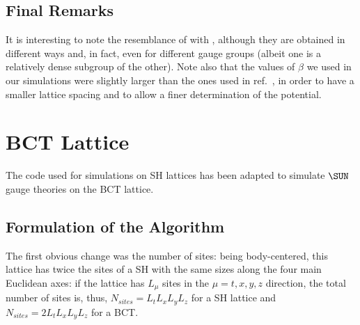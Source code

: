 \subsection{Final Remarks}
It is interesting to note the resemblance of  with , although they are obtained in different ways and, in fact, even for different gauge groups (albeit one is a relatively dense subgroup of the other).
Note also that the values of $\beta$ we used in our simulations were slightly larger than the ones used in ref.~\cite{Lang:1982tj}, in order to have a smaller lattice spacing and to allow a finer determination of the potential.

\section{BCT Lattice\label{Sec4:Code}}
The code used for simulations on SH lattices has been adapted to simulate $\SUN$ gauge theories on the BCT lattice.

\subsection{Formulation of the Algorithm}
The first obvious change was the number of sites: being body-centered, this lattice has twice the sites of a SH with the same sizes along the four main Euclidean axes: if the lattice has $L_\mu$ sites in the $\mu=t,x,y,z$ direction, the total number of sites is, thus, $N_{sites}=L_tL_xL_yL_z$ for a SH lattice and $N_{sites}=2L_tL_xL_yL_z$ for a BCT.

